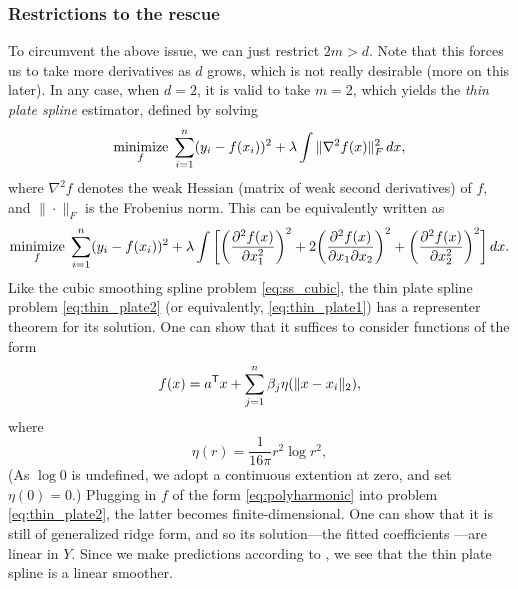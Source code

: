 \documentclass{article}
\begin{document}
\subsubsection{Restrictions to the rescue}

To circumvent the above issue, we can just restrict $2m > d$. Note that this
forces us to take more derivatives as $d$ grows, which is not really desirable
(more on this later). In any case, when $d=2$, it is valid to take $m=2$, which
yields the \emph{thin plate spline} estimator, defined by solving   
\begin{equation}
\label{eq:thin_plate1}
\mathop{\mathrm{minimize}}_f \; \sum_{i=1}^n (y_i - f(x_i))^2 + \lambda \int \|\nabla^2
f(x)\|_F^2 \, dx, 
\end{equation}
where $\nabla^2 f$ denotes the weak Hessian (matrix of weak second derivatives)
of $f$, and $\|\cdot\|_F$ is the Frobenius norm. This can be equivalently
written as  
\begin{equation}
\label{eq:thin_plate2}
\mathop{\mathrm{minimize}}_f \; \sum_{i=1}^n (y_i - f(x_i))^2 + \lambda \int \bigg[ \bigg(
\frac{\partial^2 f(x)}{\partial x_1^2}\bigg)^2 +  2\bigg( \frac{\partial^2
  f(x)}{\partial x_1 \partial x_2} \bigg)^2 +  \bigg( \frac{\partial^2
  f(x)}{\partial x_2^2} \bigg)^2 \bigg] \, dx. 
\end{equation}
Like the cubic smoothing spline problem \eqref{eq:ss_cubic}, the thin plate
spline problem \eqref{eq:thin_plate2} (or equivalently, \eqref{eq:thin_plate1}) 
has a representer theorem for its solution. One can show that it suffices to
consider functions of the form  
\begin{equation} 
\label{eq:polyharmonic}
f(x) = a^{\mathsf{T}} x + \sum_{j=1}^n \beta_j \eta(\|x - x_i\|_2),
\end{equation}
where 
\[
\eta(r) = \frac{1}{16 \pi} r^2 \log r^2,
\]
(As $\log 0$ is undefined, we adopt a continuous extention at zero, and set
$\eta(0) = 0$.) Plugging in $f$ of the form \eqref{eq:polyharmonic} into problem 
\eqref{eq:thin_plate2}, the latter becomes finite-dimensional. One can show that
it is still of generalized ridge form, and so its solution---the fitted coefficients
---are linear in $Y$. Since we make predictions
according to , we see that the thin plate spline is a linear smoother.  
\end{document}
